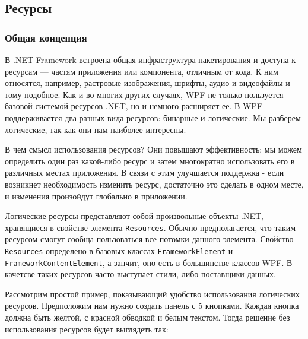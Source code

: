 \subsection{Ресурсы}

\subsubsection{Общая концепция}
В .NET Framework встроена общая инфраструктура пакетирования и доступа к ресурсам — частям приложения или компонента, отличным от кода. К ним относятся, например, растровые изображения, шрифты, аудио и видеофайлы и тому подобное. Как и во многих других случаях, WPF не только пользуется базовой системой ресурсов .NET, но и немного расширяет ее. В WPF поддерживается два разных вида ресурсов: бинарные и логические. Мы разберем логические, так как они нам наиболее интересны.

В чем смысл использования ресурсов? Они повышают эффективность: мы можем определить один раз какой-либо ресурс и затем многократно использовать его в различных местах приложения. В связи с этим улучшается поддержка - если возникнет необходимость изменить ресурс, достаточно это сделать в одном месте, и изменения произойдут глобально в приложении.

Логические ресурсы представляют собой произвольные объекты .NET, хранящиеся в свойстве элемента \texttt{Resources}. Обычно предполагается, что таким ресурсом смогут сообща пользоваться все потомки данного элемента. Свойство \texttt{Resources}  определено в базовых классах \texttt{FrameworkElement} и \texttt{FrameworkContentElement}, а занчит, оно есть в большинстве классов WPF. В качетсве таких ресурсов часто выступает стили, либо поставщики данных.

Рассмотрим простой пример, показывающий удобство использования логических ресурсов. Предположим нам нужно создать панель с 5 кнопками. Каждая кнопка должна быть желтой, с красной обводкой и белым текстом. Тогда решение без использования ресурсов будет выглядеть так:

